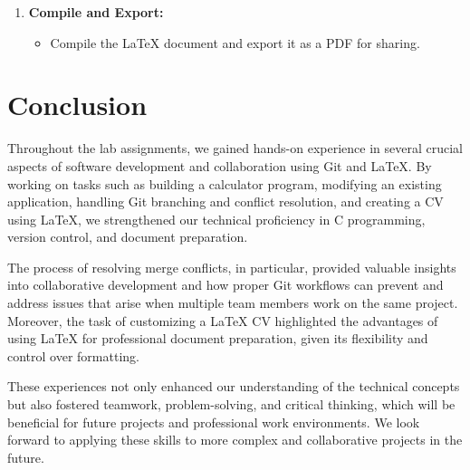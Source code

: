 \documentclass[a4paper,12pt]{article}
\begin{document}
\begin{enumerate}[label=\arabic*.]

    \item \textbf{Compile and Export:}
    \begin{itemize}
        \item Compile the LaTeX document and export it as a PDF for sharing.
    \end{itemize}
\end{enumerate}

\section{Conclusion}

Throughout the lab assignments, we gained hands-on experience in several crucial aspects of software development and collaboration using Git and LaTeX. By working on tasks such as building a calculator program, modifying an existing application, handling Git branching and conflict resolution, and creating a CV using LaTeX, we strengthened our technical proficiency in C programming, version control, and document preparation.

The process of resolving merge conflicts, in particular, provided valuable insights into collaborative development and how proper Git workflows can prevent and address issues that arise when multiple team members work on the same project. Moreover, the task of customizing a LaTeX CV highlighted the advantages of using LaTeX for professional document preparation, given its flexibility and control over formatting.

These experiences not only enhanced our understanding of the technical concepts but also fostered teamwork, problem-solving, and critical thinking, which will be beneficial for future projects and professional work environments. We look forward to applying these skills to more complex and collaborative projects in the future.
\end{document}
